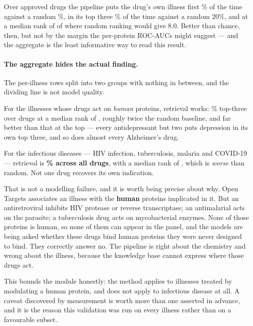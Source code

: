 Over \TgtValDrugs{} approved drugs the pipeline puts the drug's own illness first \TgtValTopOne\%
of the time against a random \TgtValRandom\%, in its top three \TgtValTopThree\% of the time
against a random $20\%$, and at a median rank of \TgtValMedian{} of \TgtNDiseases{} where random
ranking would give $8.0$. Better than chance, then, but not by the margin the per-protein
ROC-AUCs might suggest --- and the aggregate is the least informative way to read this result.


\paragraph{The aggregate hides the actual finding.} The per-illness rows split into two groups
with nothing in between, and the dividing line is not model quality.

For the \TgtValApplicableIllnesses{} illnesses whose drugs act on \emph{human} proteins, retrieval
works: \TgtValApplicableTopThree\% top-three over \TgtValApplicableDrugs{} drugs at a median rank
of \TgtValApplicableMedian{}, roughly twice the random baseline, and far better than that at the
top --- every antidepressant but two puts depression in its own top three, and so does almost
every Alzheimer's drug.

For the \TgtValInfectiousIllnesses{} infectious diseases --- HIV infection, tuberculosis, malaria
and COVID-19 --- retrieval is \textbf{\TgtValInfectiousTopThree\% across all
\TgtValInfectiousDrugs{} drugs}, with a median rank of \TgtValInfectiousMedian{}, which is
\emph{worse} than random. Not one drug recovers its own indication.

That is not a modelling failure, and it is worth being precise about why. Open Targets associates
an illness with the \textbf{human} proteins implicated in it. But an antiretroviral inhibits HIV
protease or reverse transcriptase; an antimalarial acts on the parasite; a tuberculosis drug acts
on mycobacterial enzymes. None of those proteins is human, so none of them can appear in the
panel, and the models are being asked whether these drugs bind human proteins they were never
designed to bind. They correctly answer no. The pipeline is right about the chemistry and wrong
about the illness, because the knowledge base cannot express where those drugs act.

This bounds the module honestly: the method applies to illnesses treated by modulating a human
protein, and does not apply to infectious disease at all. A caveat discovered by measurement is
worth more than one asserted in advance, and it is the reason this validation was run on every
illness rather than on a favourable subset.

